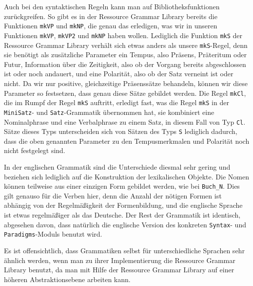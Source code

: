 Auch bei den syntaktischen Regeln kann man auf Bibliotheksfunktionen zurückgreifen. So gibt es in der Ressource Grammar Library bereits die Funktionen \texttt{mkVP} und \texttt{mkNP}, die genau das erledigen, was wir in unseren Funktionen \texttt{mkVP}, \texttt{mkVP2} und \texttt{mkNP} haben wollen. Lediglich die Funktion \texttt{mkS} der Ressource Grammar Library verhält sich etwas anders als unsere \texttt{mkS}-Regel, denn sie benötigt als zusätzliche Parameter ein Tempus, also Präsens, Präteritum oder Futur, Information über die Zeitigkeit, also ob der Vorgang bereits abgeschlossen ist oder noch andauert, und eine Polarität, also ob der Satz verneint ist oder nicht. Da wir nur positive, gleichzeitige Präsenssätze behandeln, können wir diese Parameter so festsetzen, dass genau diese Sätze gebildet werden. Die Regel \texttt{mkCl}, die im Rumpf der Regel \texttt{mkS} auftritt, erledigt fast, was die Regel \texttt{mkS} in der \texttt{MiniSatz}- und \texttt{Satz}-Grammatik übernommen hat, sie kombiniert eine Nominalphrase und eine Verbalphrase zu einem Satz, in diesem Fall von Typ \texttt{Cl}. Sätze dieses Typs unterscheiden sich von Sätzen des Typs \texttt{S} lediglich dadurch, dass die oben genannten Parameter zu den Tempusmerkmalen und Polarität noch nicht festgelegt sind.\par

In der englischen Grammatik sind die Unterschiede diesmal sehr gering und beziehen sich lediglich auf die Konstruktion der lexikalischen Objekte. Die Nomen können teilweise aus einer einzigen Form gebildet werden, wie bei \texttt{Buch\_N}. Dies gilt genauso für die Verben hier, denn die Anzahl der nötigen Formen ist abhängig von der Regelmäßigkeit der Formenbildung, und die englische Sprache ist etwas regelmäßiger als das Deutsche. Der Rest der Grammatik ist identisch, abgesehen davon, dass natürlich die englische Version des konkreten \texttt{Syntax}- und \texttt{Paradigms}-Moduls benutzt wird. \par
Es ist offensichtlich, dass Grammatiken selbst für unterschiedliche Sprachen sehr ähnlich werden, wenn man zu ihrer Implementierung die Ressource Grammar Library benutzt, da man mit Hilfe der Ressource Grammar Library auf einer höheren Abstraktionsebene arbeiten kann.